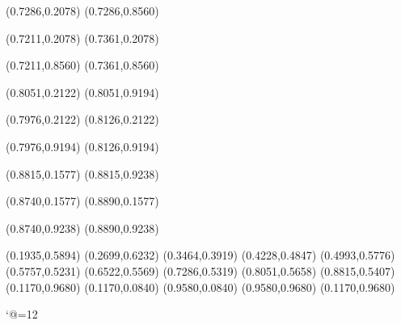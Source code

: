 \PST@Solid(0.7286,0.2078)
(0.7286,0.8560)

\PST@Solid(0.7211,0.2078)
(0.7361,0.2078)

\PST@Solid(0.7211,0.8560)
(0.7361,0.8560)

\PST@Solid(0.8051,0.2122)
(0.8051,0.9194)

\PST@Solid(0.7976,0.2122)
(0.8126,0.2122)

\PST@Solid(0.7976,0.9194)
(0.8126,0.9194)

\PST@Solid(0.8815,0.1577)
(0.8815,0.9238)

\PST@Solid(0.8740,0.1577)
(0.8890,0.1577)

\PST@Solid(0.8740,0.9238)
(0.8890,0.9238)

\PST@Diamond(0.1935,0.5894)
\PST@Diamond(0.2699,0.6232)
\PST@Diamond(0.3464,0.3919)
\PST@Diamond(0.4228,0.4847)
\PST@Diamond(0.4993,0.5776)
\PST@Diamond(0.5757,0.5231)
\PST@Diamond(0.6522,0.5569)
\PST@Diamond(0.7286,0.5319)
\PST@Diamond(0.8051,0.5658)
\PST@Diamond(0.8815,0.5407)
\PST@Border(0.1170,0.9680)
(0.1170,0.0840)
(0.9580,0.0840)
(0.9580,0.9680)
(0.1170,0.9680)

\catcode`@=12
\fi
\endpspicture
